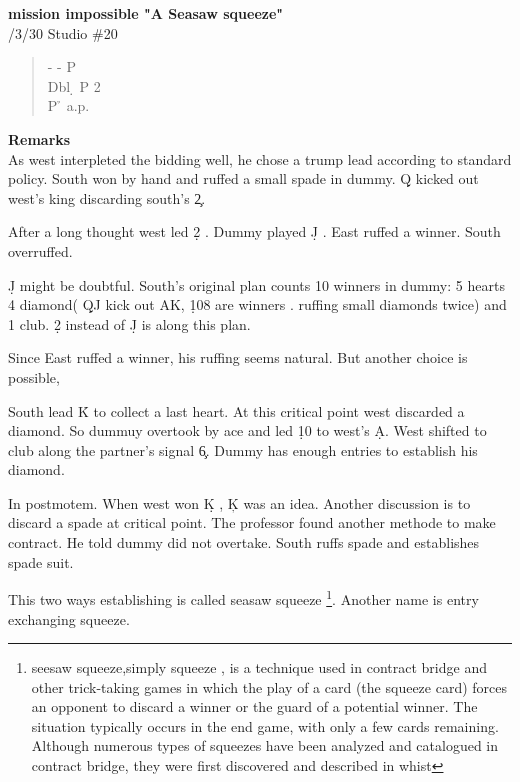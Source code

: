 \vspace{0.5cm}
{\bf mission impossible "A Seasaw squeeze"}\\
/3/30 Studio \#20
\begin{quote}
%
  {}%
  {}
  {}%
  {}%
\end{quote}
\begin{quote}
\begin{bidding}
-  \> -  \> P \s \\
Dbl \d \> P 2\h \\
P \h \> a.p.
\end{bidding}
\end{quote}

{\bf Remarks}\\
As west interpleted the bidding well, he chose  a trump
lead according to standard policy. South won by hand and
ruffed a small spade in dummy. \d Q kicked out west's king
discarding south's \c 2. 

After a long thought west led \d2 . Dummy played \d J .
East ruffed a winner. South overruffed.

\d J might be doubtful. South's original plan counts 10
winners in dummy: 5 hearts 4 diamond( \d QJ kick out AK, \d 108
are winners . ruffing small diamonds twice) and 1 club. \d 2 instead of \d J
is along this plan.

Since East ruffed a winner, his ruffing seems natural. But
another choice is possible, 

South lead \h K to collect a last heart. At this critical point
west discarded a diamond. So dummuy overtook by ace and led 
\d 10 to west's \d A. West shifted to club along the partner's signal 
\c 6. Dummy has enough entries to establish his diamond.

In postmotem. When west won \d K , \c K was an idea.
Another discussion is to discard a spade at critical point.
The professor found another methode to make contract.
He told dummy did not overtake. South ruffs spade and
establishes spade suit. 

This two ways establishing is called seasaw squeeze
\footnote{
seesaw squeeze,simply squeeze , is a technique used in contract bridge and other trick-taking games in which the play of a card (the squeeze card) forces an opponent to discard a winner or the guard of a potential winner. The situation typically occurs in the end game, with only a few cards remaining. Although numerous types of squeezes have been analyzed and catalogued in contract bridge, they were first discovered and described in whist
}.
Another name is entry exchanging squeeze.

